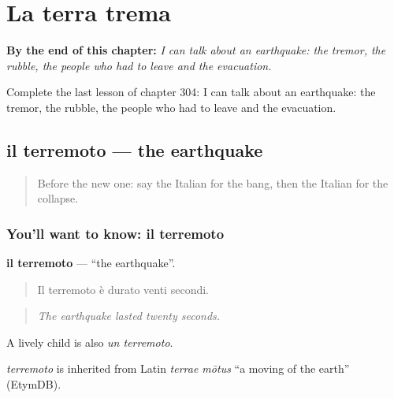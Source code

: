 
\chapter{La terra trema}
\label{ch:it-la-terra-trema}

\begin{chapteropening}
\textbf{By the end of this chapter:} \emph{I can talk about an earthquake: the tremor, the rubble, the people who had to leave and the evacuation.}

Complete the last lesson of chapter 304: I can talk about an earthquake: the tremor, the rubble, the people who had to leave and the evacuation.
\end{chapteropening}

\section[il terremoto]{il terremoto — the earthquake}

\label{lesson:IT-C304-terremoto}



\begin{quote}
Before the new one: say the Italian for the bang, then the Italian for the collapse.
\end{quote}

\subsection*{You'll want to know: il terremoto}
\textbf{il terremoto} — \textquotedblleft{}the earthquake\textquotedblright{}.

\begin{quote}
Il terremoto è durato venti secondi.
\end{quote}

\begin{quote}
\emph{The earthquake lasted twenty seconds.}
\end{quote}

A lively child is also \emph{un terremoto}.

\begin{cousinweb}
\emph{terremoto} is inherited from Latin \emph{terrae mōtus} \textquotedblleft{}a moving of the earth\textquotedblright{} (EtymDB).
\end{cousinweb}

